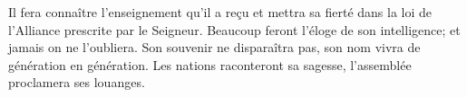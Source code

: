 Il fera connaître l’enseignement qu’il a reçu
	et mettra sa fierté dans la loi de l’Alliance prescrite par le Seigneur.
Beaucoup feront l’éloge de son intelligence; et jamais on ne l’oubliera.
	Son souvenir ne disparaîtra pas, son nom vivra de génération en génération.
Les nations raconteront sa sagesse, l’assemblée proclamera ses louanges.
